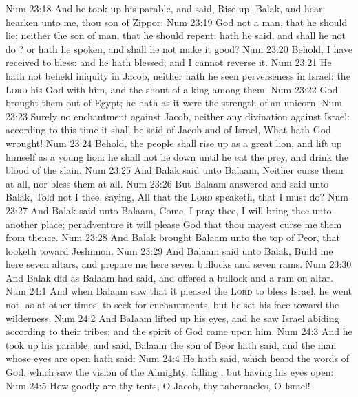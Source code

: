 \vs Num 23:18 And he took up his parable, and said, Rise up, Balak, and hear; hearken unto me, thou son of Zippor:
\vs Num 23:19 God  not a man, that he should lie; neither the son of man, that he should repent: hath he said, and shall he not do ? or hath he spoken, and shall he not make it good?
\vs Num 23:20 Behold, I have received  to bless: and he hath blessed; and I cannot reverse it.
\vs Num 23:21 He hath not beheld iniquity in Jacob, neither hath he seen perverseness in Israel: the \textsc{Lord} his God  with him, and the shout of a king  among them.
\vs Num 23:22 God brought them out of Egypt; he hath as it were the strength of an unicorn.
\vs Num 23:23 Surely  no enchantment against Jacob, neither  any divination against Israel: according to this time it shall be said of Jacob and of Israel, What hath God wrought!
\vs Num 23:24 Behold, the people shall rise up as a great lion, and lift up himself as a young lion: he shall not lie down until he eat  the prey, and drink the blood of the slain.
\vs Num 23:25 And Balak said unto Balaam, Neither curse them at all, nor bless them at all.
\vs Num 23:26 But Balaam answered and said unto Balak, Told not I thee, saying, All that the \textsc{Lord} speaketh, that I must do?
\vs Num 23:27 And Balak said unto Balaam, Come, I pray thee, I will bring thee unto another place; peradventure it will please God that thou mayest curse me them from thence.
\vs Num 23:28 And Balak brought Balaam unto the top of Peor, that looketh toward Jeshimon.
\vs Num 23:29 And Balaam said unto Balak, Build me here seven altars, and prepare me here seven bullocks and seven rams.
\vs Num 23:30 And Balak did as Balaam had said, and offered a bullock and a ram on  altar.
\vs Num 24:1 And when Balaam saw that it pleased the \textsc{Lord} to bless Israel, he went not, as at other times, to seek for enchantments, but he set his face toward the wilderness.
\vs Num 24:2 And Balaam lifted up his eyes, and he saw Israel abiding  according to their tribes; and the spirit of God came upon him.
\vs Num 24:3 And he took up his parable, and said, Balaam the son of Beor hath said, and the man whose eyes are open hath said:
\vs Num 24:4 He hath said, which heard the words of God, which saw the vision of the Almighty, falling , but having his eyes open:
\vs Num 24:5 How goodly are thy tents, O Jacob,  thy tabernacles, O Israel!
